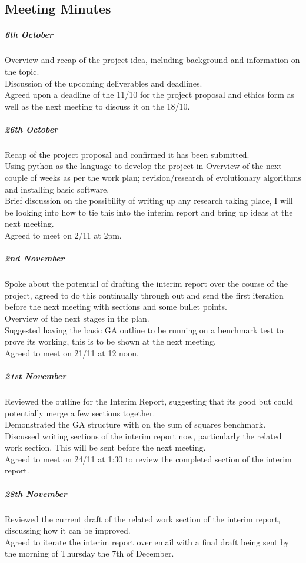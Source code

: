 \documentclass[a4paper]{article}
\begin{document}
\subsection{Meeting Minutes}
\subparagraph{6th October}
Overview and recap of the project idea, including background and information on the topic.\\
Discussion of the upcoming deliverables and deadlines.\\
Agreed upon a deadline of the 11/10 for the project proposal and ethics form as well as the next meeting to discuss it on the 18/10.
\subparagraph{26th October}
Recap of the project proposal and confirmed it has been submitted.\\
Using python as the language to develop the project in
Overview of the next couple of weeks as per the work plan; revision/research of evolutionary algorithms and installing basic software.\\
Brief discussion on the possibility of writing up any research taking place, I will be looking into how to tie this into the interim report and bring up ideas at the next meeting.\\
Agreed to meet on 2/11 at 2pm.
\subparagraph{2nd November}
Spoke about the potential of drafting the interim report over the course of the project, agreed to do this continually through out and send the first iteration before the next meeting with sections and some bullet points.\\
Overview of the next stages in the plan.\\
Suggested having the basic GA outline to be running on a benchmark test to prove its working, this is to be shown at the next meeting.\\
Agreed to meet on 21/11 at 12 noon.
\subparagraph{21st November}
Reviewed the outline for the Interim Report, suggesting that its good but could potentially merge a few sections together.\\
Demonstrated the GA structure with on the sum of squares benchmark.\\
Discussed writing sections of the interim report now, particularly the related work section. This will be sent before the next meeting.\\
Agreed to meet on 24/11 at 1:30 to review the completed section of the interim report.
\subparagraph{28th November}
Reviewed the current draft of the related work section of the interim report, discussing how it can be improved.\\
Agreed to iterate the interim report over email with a final draft being sent by the morning of Thursday the 7th of December.\\
\end{document}
